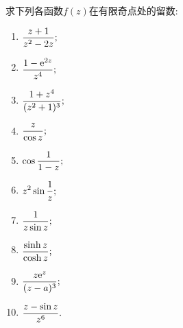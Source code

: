 \begin{yyEx}
	求下列各函数$f(z)$在有限奇点处的留数:
	\begin{enumerate}
		\item $\begin{lgathered}
			\frac{z+1}{z^2-2z};
		\end{lgathered}$
		\item $\begin{lgathered}
		\frac{1-\mathrm{e}^{2z}}{z^4};
		\end{lgathered}$
		\item $\begin{lgathered}
		\frac{1+z^4}{(z^2+1)^3};
		\end{lgathered}$
		\item $\begin{lgathered}
		\frac{z}{\cos z};
		\end{lgathered}$
		\item $\begin{lgathered}
		\cos\frac{1}{1-z};
		\end{lgathered}$
		\item $\begin{lgathered}
		z^2\sin\frac{1}{z};
		\end{lgathered}$
		\item $\begin{lgathered}
		\frac{1}{z\sin z};
		\end{lgathered}$
		\item $\begin{lgathered}
		\frac{\sinh z}{\cosh z};
		\end{lgathered}$
		\item $\begin{lgathered}
		\frac{z\mathrm{e}^z}{(z-a)^3};
		\end{lgathered}$
		\item $\begin{lgathered}
		\frac{z-\sin z}{z^6}.
		\end{lgathered}$
	\end{enumerate}
\end{yyEx}

